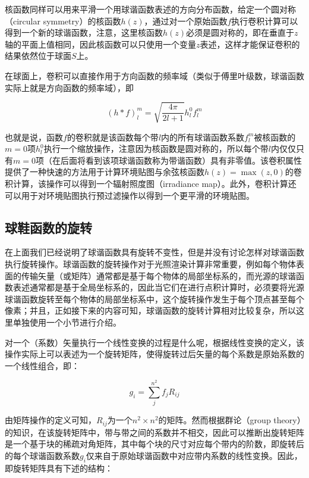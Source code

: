 核函数同样可以用来平滑一个用球谐函数表述的方向分布函数，给定一个圆对称（circular symmetry）的核函数$h(z)$，通过对一个原始函数$f$执行卷积计算可以得到一个新的球谐函数，注意，这里核函数$h(z)$必须是圆对称的，即在垂直于$z$轴的平面上值相同，因此核函数可以只使用一个变量$z$表述，这样才能保证卷积的结果依然位于球面$S$上。

在球面上，卷积可以直接作用于方向函数的频率域（类似于傅里叶级数，球谐函数实际上就是方向函数的频率域），即

\begin{equation}\label{e:pl-sh-convolution}
	(h*f)^{m}_{l}=\sqrt{\frac{4\pi}{2l+1}}h^{0}_{l}f^{m}_{l}
\end{equation} 

也就是说，函数$f$的卷积就是该函数每个带$l$内的所有球谐函数系数$f^{m}_l$被核函数的$m=0$项$h^{0}_l$执行一个缩放操作，注意因为核函数是圆对称的，所以每个带$l$内仅仅只有$m=0$项（在后面将看到该项球谐函数称为带谐函数）具有非零值。该卷积属性提供了一种快速的方法用于计算环境贴图与余弦核函数$h(z) = \max(z,0)$的卷积计算，该操作可以得到一个辐射照度图（irradiance map）。此外，卷积计算还可以用于对环境贴图执行预过滤操作以得到一个更平滑的环境贴图。
	
	

\subsection{球鞋函数的旋转}\label{sec:pl-rotation}
在上面我们已经说明了球谐函数具有旋转不变性，但是并没有讨论怎样对球谐函数执行旋转操作。球谐函数的旋转操作对于光照渲染计算非常重要，例如每个物体表面的传输矢量（或矩阵）通常都是基于每个物体的局部坐标系的，而光源的球谐函数表述通常都是基于全局坐标系的，因此当它们在进行点积计算时，必须要将光源球谐函数旋转至每个物体的局部坐标系中，这个旋转操作发生于每个顶点甚至每个像素；并且，正如接下来的内容可知，球谐函数的旋转计算相对比较复杂，所以这里单独使用一个小节进行介绍。

对一个（系数）矢量执行一个线性变换的过程是什么呢，根据线性变换的定义，该操作实际上可以表述为一个旋转矩阵，使得旋转过后矢量的每个系数是原始系数的一个线性组合，即：

\begin{equation}\label{e:pl-linear-transform}
	g_i=\sum^{n^{2}}_j f_j R_{ij}
\end{equation}

由矩阵操作的定义可知，$R_{ij}$为一个$n^{2}\times n^{2}$的矩阵。然而根据群论（group theory）的知识，在该旋转矩阵中，带与带之间的系数并不相交，因此可以推断出旋转矩阵是一个基于块的稀疏对角矩阵，其中每个块的尺寸对应每个带内的阶数，即旋转后的每个球谐函数系数$g_i$仅来自于原始球谐函数中对应带内系数的线性变换。因此，即旋转矩阵具有下述的结构：

